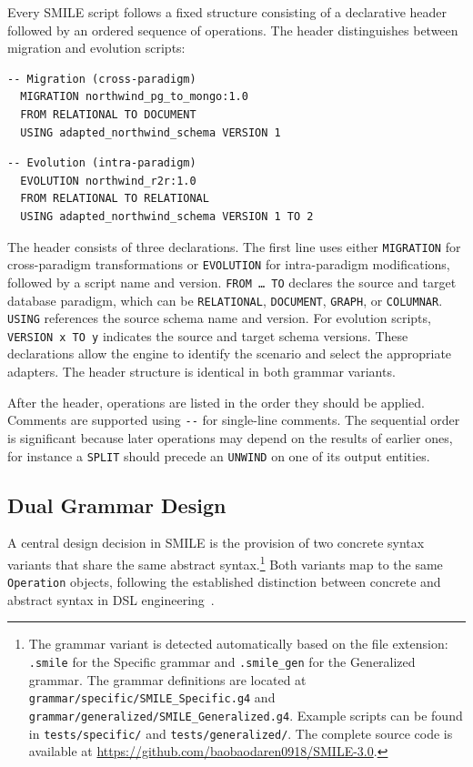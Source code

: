   Every SMILE  script follows a fixed structure consisting of a declarative header followed by an ordered sequence of operations. The header
  distinguishes between migration and evolution scripts:

  \begin{lstlisting}[basicstyle=\small\ttfamily]
  -- Migration (cross-paradigm)
  MIGRATION northwind_pg_to_mongo:1.0
  FROM RELATIONAL TO DOCUMENT
  USING adapted_northwind_schema VERSION 1
  \end{lstlisting}

  \begin{lstlisting}[basicstyle=\small\ttfamily]
  -- Evolution (intra-paradigm)
  EVOLUTION northwind_r2r:1.0
  FROM RELATIONAL TO RELATIONAL
  USING adapted_northwind_schema VERSION 1 TO 2
  \end{lstlisting}


  The header consists of three declarations. The first line uses either \texttt{MIGRATION} for cross-paradigm transformations or \texttt{EVOLUTION}
  for intra-paradigm modifications, followed by a script name and version. \texttt{FROM \ldots\ TO} declares the source and target database
  paradigm, which can be \texttt{RELATIONAL}, \texttt{DOCUMENT}, \texttt{GRAPH}, or \texttt{COLUMNAR}. \texttt{USING} references the source schema
  name and version. For evolution scripts, \texttt{VERSION x TO y} indicates the source and target schema versions. These declarations allow the
  engine to identify the scenario and select the appropriate adapters. The header structure is identical in both grammar variants.

  After the header, operations are listed in the order they should be applied. Comments are supported using \texttt{-{}-} for single-line comments.
The sequential order is significant because later operations may depend on the results of earlier ones, for instance a \texttt{SPLIT} should precede an \texttt{UNWIND} on one of its output entities.

\subsection{Dual Grammar Design}\label{subsec:dual-grammar}
  A central design decision in SMILE is the provision of two concrete syntax variants that share the same abstract syntax.\footnote{The grammar variant is detected automatically based on the file extension: \texttt{.smile} for the Specific grammar and \texttt{.smile\_gen} for the
  Generalized grammar. The grammar definitions are located at \texttt{grammar/specific/SMILE\_Specific.g4} and \texttt{grammar/generalized/SMILE\_Generalized.g4}.
  Example scripts can be found in \texttt{tests/specific/} and \texttt{tests/generalized/}. The
  complete source code is available at \url{https://github.com/baobaodaren0918/SMILE-3.0}.} Both
  variants map to the same \texttt{Operation} objects, following the established distinction
  between concrete and abstract syntax in DSL engineering~\cite{mernik2005and}.


